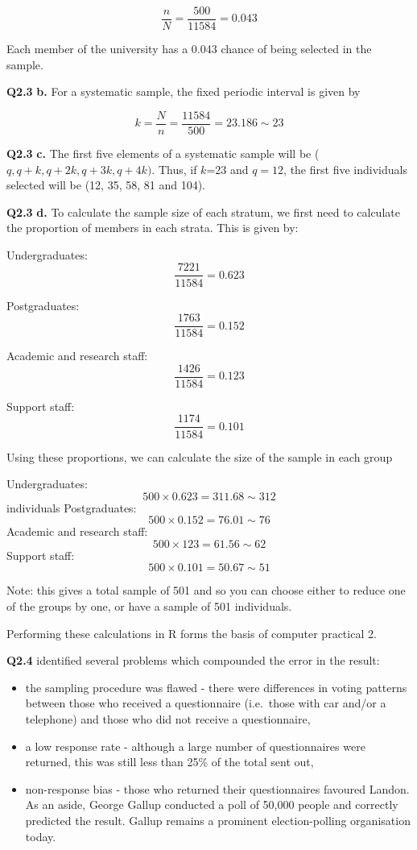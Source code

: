\documentclass[
  oneside]{krantz}
\begin{document}
\[ \frac{n}{N} = \frac{500}{11584} = 0.043\]

Each member of the university has a 0.043 chance of being selected in the sample.

\textbf{Q2.3} \textbf{b.} For a systematic sample, the fixed periodic interval is given by

\[k = \frac{N}n = \frac{11584}{500} = 23.186 \sim 23\]

\textbf{Q2.3} \textbf{c.} The first five elements of a systematic sample will be (\(q, q+k, q+2k, q+3k, q+4k)\). Thus, if \(k\)=23 and \(q=12\), the first five individuals selected will be (12, 35, 58, 81 and 104).

\textbf{Q2.3} \textbf{d.} To calculate the sample size of each stratum, we first need to calculate the proportion of members in each strata. This is given by:

Undergraduates: \[\frac{7221}{11584} = 0.623 \]

Postgraduates: \[\frac{1763}{11584} = 0.152 \]

Academic and research staff: \[\frac{1426}{11584} = 0.123 \]

Support staff: \[\frac{1174}{11584} = 0.101 \]

Using these proportions, we can calculate the size of the sample in each group

Undergraduates: \[500 \times 0.623 = 311.68 \sim 312 \] individuals
Postgraduates: \[500 \times 0.152 = 76.01 \sim 76 \]
Academic and research staff: \[500 \times 123 = 61.56 \sim 62 \]
Support staff: \[500 \times 0.101 = 50.67 \sim 51 \]

Note: this gives a total sample of 501 and so you can choose either to reduce one of the groups by one, or have a sample of 501 individuals.

Performing these calculations in R forms the basis of computer practical 2.

\textbf{Q2.4} \citep{Squire1} identified several problems which compounded the error in the result:

\begin{itemize}
\item
  the sampling procedure was flawed - there were differences in voting patterns between those who received a questionnaire (i.e.~those with car and/or a telephone) and those who did not receive a questionnaire,
\item
  a low response rate - although a large number of questionnaires were returned, this was still less than 25\% of the total sent out,
\item
  non-response bias - those who returned their questionnaires favoured Landon.
  As an aside, George Gallup conducted a poll of 50,000 people and correctly predicted the result. Gallup remains a prominent election-polling organisation today.
\end{itemize}
\end{document}
